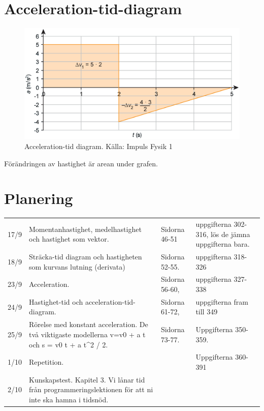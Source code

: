 \documentclass[11pt]{article}
\begin{document}
\section{Acceleration-tid-diagram}
\begin{figure}[!h]
\includegraphics[width=\textwidth]{../images/chapter3/accelerationTime.png}
\caption{Acceleration-tid diagram. Källa: Impuls Fysik 1}
\end{figure}
Förändringen av hastighet är arean under grafen.
\clearpage
\section{Planering}
\begin{table}[h]
\begin{tabular}{|l|p{6cm}|p{4cm}|l}
    \hline
    17/9 & Momentanhastighet, medelhastighet och hastighet som vektor. & Sidorna 46-51 & uppgifterna 302-316, lös de jämna uppgifterna bara. \\

    18/9 & Sträcka-tid diagram och hastigheten som kurvans lutning (derivata) & Sidorna 52-55. & uppgifterna 318-326 \\

    23/9 & Acceleration. & Sidorna 56-60, &  uppgifterna 327-338 \\

    24/9 & Hastighet-tid och acceleration-tid-diagram. & Sidorna 61-72, & uppgifterna fram till 349 \\

    25/9 & Rörelse med konstant acceleration. De två viktigaste modellerna v=v0 + a t och s = v0
    t + a t^2 / 2.  & Sidorna 73-77. &  Uppgifterna 350-359. \\

    1/10 & Repetition. & & Uppgifterna 360-391 \\

    2/10 & Kunskapstest. Kapitel 3. Vi lånar tid från programmeringslektionen för att ni inte ska hamna i tidsnöd. & & \\

    \hline
\end{tabular}
\end{table}
\end{document}
